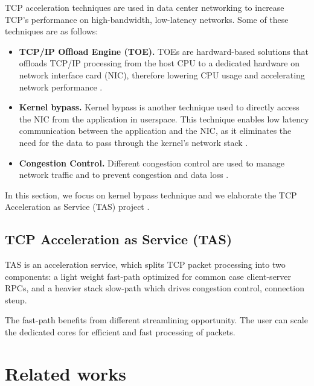 TCP acceleration techniques are used in data center networking to increase TCP's performance
on high-bandwidth, low-latency networks. Some of these techniques are as follows:
\begin{itemize}
    \item \textbf{TCP/IP Offload Engine (TOE).} TOEs are hardward-based solutions that offloads
    TCP/IP processing from the host CPU to a dedicated hardware on network interface card 
    (NIC), therefore lowering CPU usage and accelerating network performance
    \cite{shashidhara2022flextoe,wu2006design,kant2003tcp,freimuth2005server}.
    \item \textbf{Kernel bypass.} Kernel bypass is another technique used to directly access 
    the NIC from the application in userspace. This technique enables low latency 
    communication between the application and the NIC, as it eliminates the need for 
    the data to pass through the kernel's network stack 
    \cite{chen2018survey, kaufmann2019tas, marty2019snap}. 
    \item \textbf{Congestion Control.} Different congestion control are used to manage
    network traffic and to prevent congestion and data loss \cite{mittal2015timely,kumar2020swift}. 
\end{itemize}

In this section, we focus on kernel bypass technique and we elaborate the 
TCP Acceleration as Service (TAS) project \cite{kaufmann2019tas}.



\subsection{TCP Acceleration as Service (TAS)}
TAS is an acceleration service, which splits TCP packet processing 
into two components: a light weight fast-path optimized for common case client-server RPCs,
and a heavier stack slow-path which drives congestion control, connection steup. 

The fast-path benefits from different streamlining opportunity. The user can scale the 
dedicated cores for efficient and fast processing of packets.




\section{Related works}
